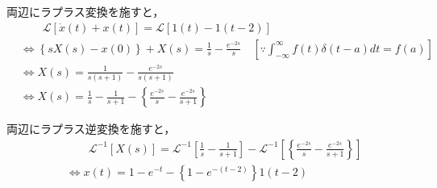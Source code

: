 \documentclass[a4paper,12pt]{article}
\begin{document}
\begin{tcolorbox}[title={6.(2) \( \dot{x}(t)+ x(t)= 1(t)- 1(t-2) \)
    }]
    \quad 両辺にラプラス変換を施すと，
    \vspace{-3mm}
    \begin{align*}
        &\qquad \mathcal{L}\left[ \dot{x}(t)+ x(t) \right] 
        = \mathcal{L} \left[ 1(t)- 1(t-2) \right] \\
        &\Leftrightarrow \left\{ sX(s) - x(0) \right\} + X(s) 
        = \frac{1}{s} - \frac{e^{-2s}}{s} \quad 
        \left[\because \int_{-\infty}^{\infty} f(t)\delta(t-a) dt = f(a)\right]\\
        &\Leftrightarrow X(s) = \frac{1}{s(s+1)} - \frac{e^{-2s}}{s(s+1)}  \\
        &\Leftrightarrow X(s) = \frac{1}{s} - \frac{1}{s+1} 
        - \left\{ \frac{e^{-2s}}{s} - \frac{e^{-2s}}{s+1} \right\} 
    \end{align*}
        
    \quad 両辺にラプラス逆変換を施すと，
    \vspace{-3mm}
    \begin{align*}
    &\qquad \mathcal{L}^{-1} \left[ X(s) \right] 
    = \mathcal{L}^{-1} \left[ \frac{1}{s} - \frac{1}{s+1}   \right] 
    - \mathcal{L}^{-1} \left[ \left\{ \frac{e^{-2s}}{s} - \frac{e^{-2s}}{s+1} \right\}  \right] \\
    &\Leftrightarrow x(t) = 1-e^{-t} - \left\{1-e^{-(t-2)}\right\} 1(t-2)
    \end{align*}
\end{tcolorbox}


\newpage
\end{document}
